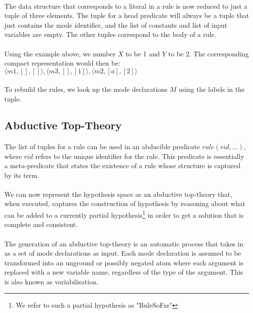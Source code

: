 \documentclass{article}
\theoremstyle{plain}
\theoremstyle{definition}
\begin{document}
\begin{multicols}{2}
\paragraph{} The data structure that corresponds to a literal in a rule is now reduced to just a tuple of three elements. The tuple for a head predicate will always be a tuple that just contains the mode identifier,  and the list of constants and list of input variables are empty. The other tuples correspond to the body of a rule. 

\paragraph{} Using the example above, we number $X$ to be 1 and $Y$ to be 2. The corresponding compact representation would then be: $\langle m1, [], []\rangle, \langle m3, [], [1] \rangle, \langle m2, [a], [2] \rangle$

\paragraph{} To rebuild the rules, we look up the mode declarations $M$ using the labels in the tuple.

\subsection{Abductive Top-Theory}

\paragraph{} The list of tuples for a rule can be used in an abducible predicate $rule(rid, \dots)$, where $rid$ refers to the unique identifier for the rule. This predicate is essentially a meta-predicate that states the existence of a rule whose structure is captured by its term. 

\paragraph{} We can now represent the hypothesis space as an abductive top-theory that, when executed, captures the construction of hypothesis by reasoning about what can be added to a currently partial hypothesis\footnote{We refer to such a partial hypothesis as "RuleSoFar"} in order to get a solution that is complete and consistent.

\paragraph{} The generation of an abductive top-theory is an automatic process that takes in as a set of mode declarations as input. Each mode declaration is assumed to be transformed into an unground or possibly negated atom where each argument is replaced with a new variable name, regardless of the type of the argument. This is also known as variabilisation.


\end{multicols}
\end{document}
